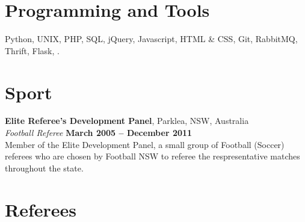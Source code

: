 \documentclass[margin,line]{resume}
\begin{document}
\begin{resume}
    \section{\mysidestyle Programming and Tools} 

    Python, UNIX, PHP, SQL, jQuery, Javascript, HTML \& CSS, Git, RabbitMQ, Thrift, Flask, \LaTeXe.


\newpage

\vspace{5mm}
\section{\mysidestyle Sport}
	
	\textbf{Elite Referee's Development Panel}, Parklea, NSW, Australia \vspace{2mm}\\\vspace{1mm}%
	\textsl{Football Referee} \hfill \textbf{March 2005 -- December 2011}\\
	Member of the Elite Development Panel, a small group of Football (Soccer) referees who are chosen by Football NSW
	to referee the respresentative matches throughout the state.


\section{\mysidestyle Referees} 


\end{resume}
\end{document}
